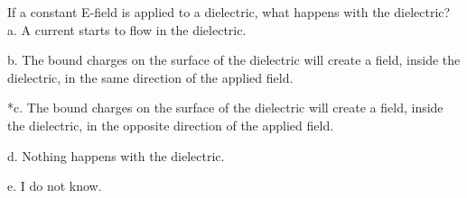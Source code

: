 
If a constant E-field is applied to a dielectric, what happens with
the dielectric?\\

a. A current starts to flow in the dielectric.

b. The bound charges on the surface of the dielectric will create a
field, inside the dielectric, in the same direction of the applied field.

*c. The bound charges on the surface of the dielectric will create a
field, inside the dielectric, in the opposite direction of the applied
field.

d. Nothing happens with the dielectric.

e. I do not know.\\
